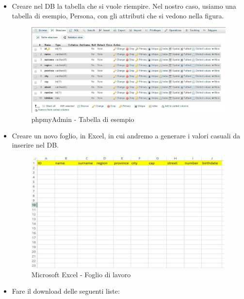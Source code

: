 \begin{itemize}

\item Creare nel DB la tabella che si vuole riempire. Nel nostro caso, usiamo una tabella di esempio, Persona, con gli attributi che si vedono nella figura. 

\begin{center}
\begin{figure}[H]
\centering
\includegraphics[scale=0.8]{figures/example_table.png}
\caption{phpmyAdmin - Tabella di esempio} 
\end{figure}
\end{center}

\item Creare un novo foglio, in Excel, in cui andremo a generare i valori casuali da inserire nel DB. 

\begin{center}
\begin{figure}[H]
\centering
\includegraphics[scale=1]{figures/excel.png}
\caption{Microsoft Excel - Foglio di lavoro} 
\end{figure}
\end{center}

\item  Fare il download delle seguenti liste:

\begin{itemize}


\end{itemize}
\end{itemize}
